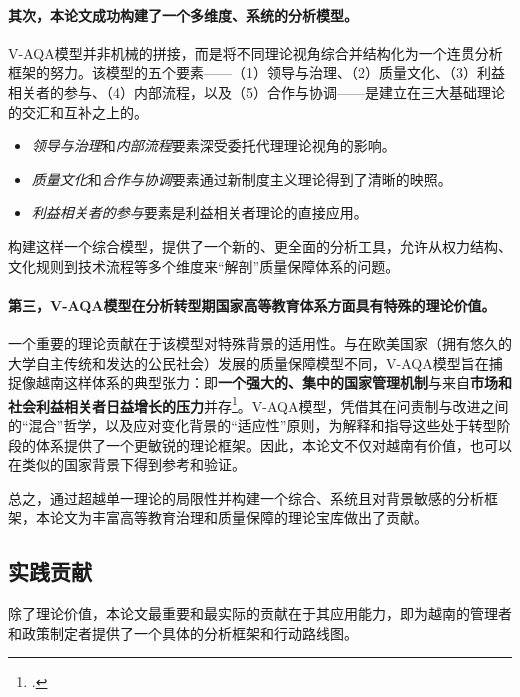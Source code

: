 \paragraph{其次，本论文成功构建了一个多维度、系统的分析模型。}
V-AQA模型并非机械的拼接，而是将不同理论视角综合并结构化为一个连贯分析框架的努力。该模型的五个要素——（1）领导与治理、（2）质量文化、（3）利益相关者的参与、（4）内部流程，以及（5）合作与协调——是建立在三大基础理论的交汇和互补之上的。
\begin{itemize}
    \item \textit{领导与治理}和\textit{内部流程}要素深受委托代理理论视角的影响。
    \item \textit{质量文化}和\textit{合作与协调}要素通过新制度主义理论得到了清晰的映照。
    \item \textit{利益相关者的参与}要素是利益相关者理论的直接应用。
\end{itemize}
构建这样一个综合模型，提供了一个新的、更全面的分析工具，允许从权力结构、文化规则到技术流程等多个维度来“解剖”质量保障体系的问题。

\paragraph{第三，V-AQA模型在分析转型期国家高等教育体系方面具有特殊的理论价值。}
一个重要的理论贡献在于该模型对特殊背景的适用性。与在欧美国家（拥有悠久的大学自主传统和发达的公民社会）发展的质量保障模型不同，V-AQA模型旨在捕捉像越南这样体系的典型张力：即\textbf{一个强大的、集中的国家管理机制}与来自\textbf{市场和社会利益相关者日益增长的压力}并存\footcite{WB_TransitionalQA}。V-AQA模型，凭借其在问责制与改进之间的“混合”哲学，以及应对变化背景的“适应性”原则，为解释和指导这些处于转型阶段的体系提供了一个更敏锐的理论框架。因此，本论文不仅对越南有价值，也可以在类似的国家背景下得到参考和验证。

总之，通过超越单一理论的局限性并构建一个综合、系统且对背景敏感的分析框架，本论文为丰富高等教育治理和质量保障的理论宝库做出了贡献。

\subsection{实践贡献}
\label{subsec:dong_gop_thuc_tien}

除了理论价值，本论文最重要和最实际的贡献在于其应用能力，即为越南的管理者和政策制定者提供了一个具体的分析框架和行动路线图。

